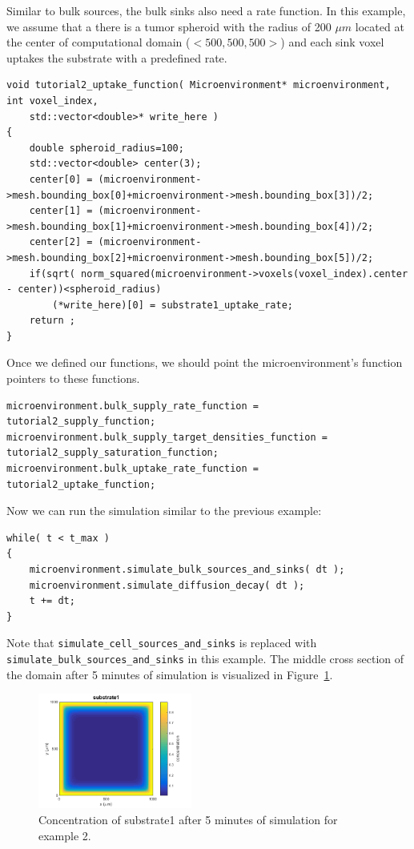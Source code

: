 \documentclass[11pt]{article}
\begin{document}
Similar to bulk sources, the bulk sinks also need a rate function. In this example, we assume that a there is a tumor spheroid
with the radius of 200 $\mu m$ located at the center of computational domain ($<500,500,500>$) and each sink voxel uptakes the substrate
with a predefined rate.

\begin{verbatim}
void tutorial2_uptake_function( Microenvironment* microenvironment, int voxel_index,
    std::vector<double>* write_here )
{
    double spheroid_radius=100;
    std::vector<double> center(3);
    center[0] = (microenvironment->mesh.bounding_box[0]+microenvironment->mesh.bounding_box[3])/2;
    center[1] = (microenvironment->mesh.bounding_box[1]+microenvironment->mesh.bounding_box[4])/2;
    center[2] = (microenvironment->mesh.bounding_box[2]+microenvironment->mesh.bounding_box[5])/2;
    if(sqrt( norm_squared(microenvironment->voxels(voxel_index).center - center))<spheroid_radius)
    	(*write_here)[0] = substrate1_uptake_rate; 	
    return ;
}
\end{verbatim}

Once we defined our functions, we should point the microenvironment's function pointers to these functions.

\begin{verbatim}
microenvironment.bulk_supply_rate_function =  tutorial2_supply_function;
microenvironment.bulk_supply_target_densities_function = tutorial2_supply_saturation_function;
microenvironment.bulk_uptake_rate_function = tutorial2_uptake_function;
\end{verbatim}

Now we can run the simulation similar to the previous example:
\begin{verbatim}
while( t < t_max )
{
    microenvironment.simulate_bulk_sources_and_sinks( dt );
    microenvironment.simulate_diffusion_decay( dt );
    t += dt;
}
\end{verbatim}

Note that \verb:simulate_cell_sources_and_sinks: is replaced with \verb:simulate_bulk_sources_and_sinks: in this example.
The middle cross section of the domain after 5 minutes of simulation is visualized in Figure~\ref{./figures/tutorial2_fig1}.

\begin{figure}[h]
\centering
\includegraphics[width=0.45\textwidth]{./figures/tutorial2_fig1.png}
\caption{Concentration of substrate1 after 5 minutes of simulation for example 2.}
\label{./figures/tutorial2_fig1}
\end{figure}
\end{document}

